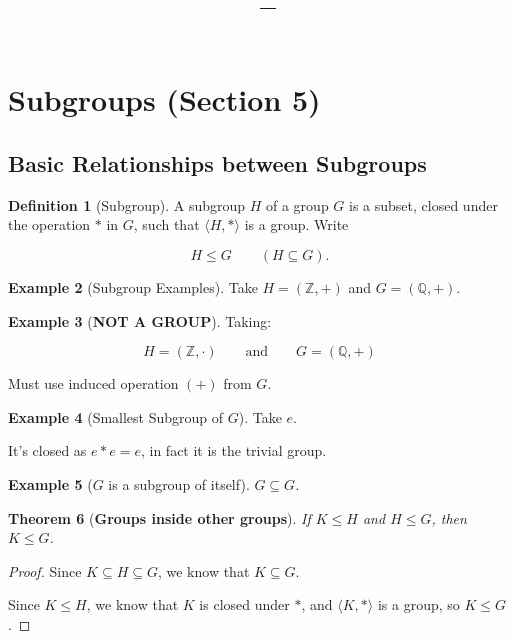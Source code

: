 \documentclass[11pt]{article}
\title{\vspace{-1.5em}\textbf{\coursename\ -- \lecturetitle}}
\author{\studentname}
\date{\lecturedate}
\newcommand{\1}{\mathbf{1}}
\theoremstyle{notestyle}
\newtheorem{theorem}{Theorem}[section]
\theoremstyle{definition}
\newtheorem{definition}[theorem]{Definition}
\newtheorem{example}[theorem]{Example}
\begin{document}
\maketitle

\section{Subgroups (Section 5)}
\subsection{Basic Relationships between Subgroups}

\begin{definition}[Subgroup]
\label{def:subgroup}
A subgroup $H$ of a group $G$ is a subset, closed under the operation $*$ in $G$, such
that $\langle H, *\rangle$ is a group. Write

$$
H \le G \qquad (H \subseteq G).
$$

\end{definition}

\begin{example}[Subgroup Examples]
\label{ex:subgroup}
Take $H = (\mathbb{Z}, +)$ and $G = (\mathbb{Q}, +)$.
\end{example}

\begin{example}[\textbf{NOT A GROUP}]
Taking:

$$
H = (\mathbb{Z}, \cdot) \qquad \text{and} \qquad G = (\mathbb{Q}, +)
$$

Must use induced operation $(+)$ from $G$.
\end{example}

\begin{example}[Smallest Subgroup of $G$]
\label{ex:trivial-subgroup}
Take ${e}$. \par
It's closed as $e * e = e$, in fact it is the trivial group.
\end{example}

\begin{example}[$G$ is a subgroup of itself]
\label{ex:self-subgroup}
$G \subseteq G.$
\end{example}

\begin{theorem}[\textbf{Groups inside other groups}]
\label{thm:subgroup-transitivity}
If $K \le H$ and $H \le G$, then $K \le G$.
\end{theorem}

\begin{proof}
Since $K \subseteq H \subseteq G$, we know that $K \subseteq G$.\par
Since $K \le H$, we know that $K$ is closed under $*$, and
$\langle K, *\rangle$ is a group, so $K \le G$.
\end{proof}
\end{document}
